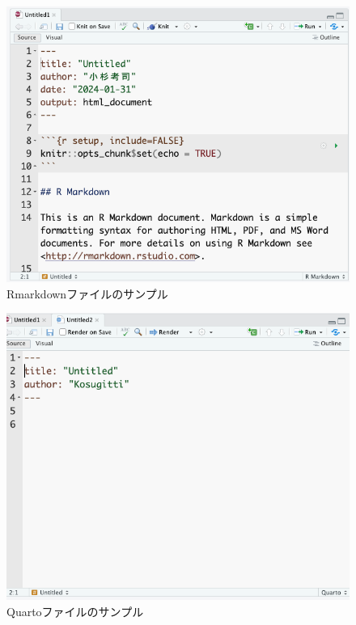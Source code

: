 \documentclass[
  a4paper,
]{ltjsbook}
\begin{document}
\begin{figure}[H]

{\centering \includegraphics{../common/images/04_RmdSample.png}

}

\caption{Rmarkdownファイルのサンプル}

\end{figure}%
\begin{figure}[H]

{\centering \includegraphics{../common/images/04_QmdSample.png}

}

\caption{Quartoファイルのサンプル}

\end{figure}%
\end{document}
